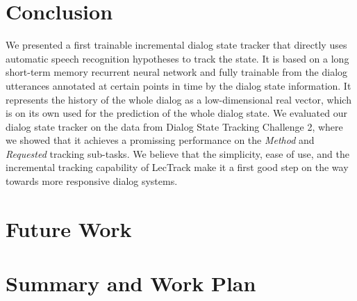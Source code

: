 \documentclass[11pt,twocolumn]{article}
\begin{document}
\section{Conclusion}
\label{sec:conclusion}
We presented a first trainable incremental dialog state tracker that directly uses automatic speech recognition hypotheses to track the state. It is based on a long short-term memory recurrent neural network and fully trainable from the dialog utterances annotated at certain points in time by the dialog state information. It represents the history of the whole dialog as a low-dimensional real vector, which is on its own used for the prediction of the whole dialog state. We evaluated our dialog state tracker on the data from Dialog State Tracking Challenge 2, where we showed that it achieves a promissing performance on the \emph{Method} and \emph{Requested} tracking sub-tasks. We believe that the simplicity, ease of use, and the incremental tracking capability of LecTrack make it a first good step on the way towards more responsive dialog systems.




\section{Future Work}


\section{Summary and Work Plan}





\end{document}
